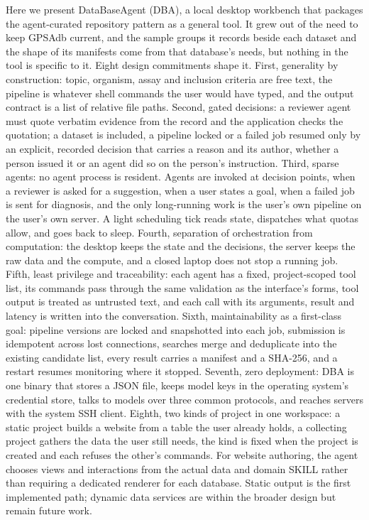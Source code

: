 \documentclass[11pt,a4paper]{article}
\begin{document}
Here we present DataBaseAgent (DBA), a local desktop workbench that
packages the agent-curated repository pattern as a general tool. It grew
out of the need to keep GPSAdb current, and the sample groups it records
beside each dataset and the shape of its manifests come from that
database's needs, but nothing in the tool is specific to it. Eight
design commitments shape it. First, generality by construction: topic,
organism, assay and inclusion criteria are free text, the pipeline is
whatever shell commands the user would have typed, and the output
contract is a list of relative file paths. Second, gated decisions: a
reviewer agent must quote verbatim evidence from the record and the
application checks the quotation; a dataset is included, a pipeline
locked or a failed job resumed only by an explicit, recorded decision
that carries a reason and its author, whether a person issued it or an
agent did so on the person's instruction. Third, sparse agents: no agent
process is resident. Agents are invoked at decision points, when a
reviewer is asked for a suggestion, when a user states a goal, when a
failed job is sent for diagnosis, and the only long-running work is the
user's own pipeline on the user's own server. A light scheduling tick
reads state, dispatches what quotas allow, and goes back to sleep.
Fourth, separation of orchestration from computation: the desktop keeps
the state and the decisions, the server keeps the raw data and the
compute, and a closed laptop does not stop a running job. Fifth, least
privilege and traceability: each agent has a fixed, project-scoped tool
list, its commands pass through the same validation as the interface's
forms, tool output is treated as untrusted text, and each call with its
arguments, result and latency is written into the conversation. Sixth,
maintainability as a first-class goal: pipeline versions are locked and
snapshotted into each job, submission is idempotent across lost
connections, searches merge and deduplicate into the existing candidate
list, every result carries a manifest and a SHA-256, and a restart
resumes monitoring where it stopped. Seventh, zero deployment: DBA is
one binary that stores a JSON file, keeps model keys in the operating
system's credential store, talks to models over three common protocols,
and reaches servers with the system SSH client. Eighth, two kinds of
project in one workspace: a static project builds a website from a
table the user already holds, a collecting project gathers the data the
user still needs, the kind is fixed when the project is created and each
refuses the other's commands. For website authoring, the agent chooses
views and interactions from the actual data and domain SKILL rather than
requiring a dedicated renderer for each database. Static output is the
first implemented path; dynamic data services are within the broader
design but remain future work.
\end{document}
